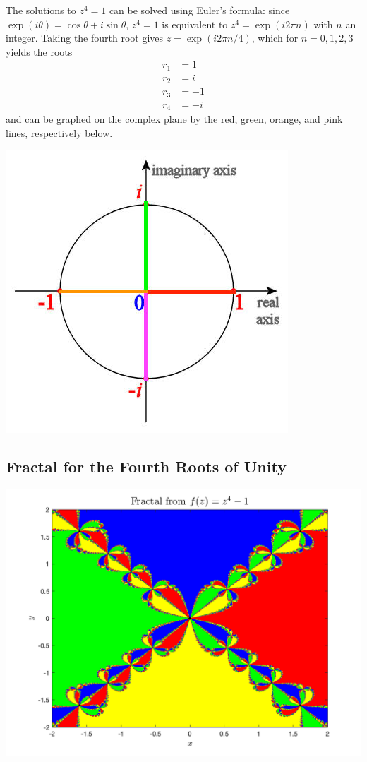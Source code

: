 \documentclass[11pt]{article}
\begin{document}
The solutions to $z^4 = 1$ can be solved using Euler's formula: since $\exp(i\theta) = \cos\theta + i \sin \theta$, $z^4 = 1$ is equivalent to $z^4 = \exp(i2\pi n)$ with $n$ an integer. Taking the fourth root gives $z = \exp(i2\pi n/4)$, which for $n = 0, 1, 2, 3$ yields the roots
\begin{align*}
  r_1 &= 1 \\
  r_2 &= i \\
  r_3 &= -1 \\
  r_4 &= -i
\end{align*}
and can be graphed on the complex plane by the red, green, orange, and pink lines, respectively below.

\begin{center}
\includegraphics[width=0.5\linewidth]{plane.jpeg}
\end{center}

\subsection{Fractal for the Fourth Roots of Unity}

\begin{center}
\includegraphics[width=0.7\linewidth]{z4.png}
\end{center}
\end{document}
